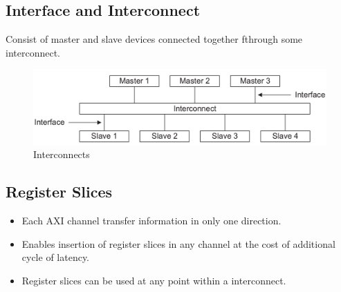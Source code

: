 \documentclass{article}
\begin{document}
\subsection{Interface and Interconnect}
\quad Consist of master and slave devices connected together fthrough some interconnect.
\begin{figure}[H]
    \centering
    \includegraphics[width=1\textwidth]{./Resources/interconnect.png}    
    \caption{Interconnects}
\end{figure}

\subsection{Register Slices}
\begin{itemize}
    \item Each AXI channel transfer information in only one direction.
    \item Enables insertion of register slices in any channel at the cost of additional cycle of latency.
    \item Register slices can be used at any point within a interconnect.
\end{itemize}
\end{document}
